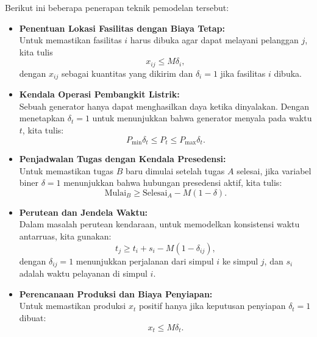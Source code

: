 Berikut ini beberapa penerapan teknik pemodelan tersebut:

\begin{itemize}
  \item \textbf{Penentuan Lokasi Fasilitas dengan Biaya Tetap:}\\
  Untuk memastikan fasilitas \(i\) harus dibuka agar dapat melayani pelanggan \(j\), kita tulis
  \[
  x_{ij} \le M \delta_i,
  \]
  dengan \(x_{ij}\) sebagai kuantitas yang dikirim dan \(\delta_i = 1\) jika fasilitas \(i\) dibuka.


  \item \textbf{Kendala Operasi Pembangkit Listrik:}\\
  Sebuah generator hanya dapat menghasilkan daya ketika dinyalakan. Dengan menetapkan \(\delta_t = 1\) untuk menunjukkan bahwa generator menyala pada waktu \(t\), kita tulis:
  \[
  P_{\min} \delta_t \le P_t \le P_{\max} \delta_t.
  \]

  \item \textbf{Penjadwalan Tugas dengan Kendala Presedensi:}\\
  Untuk memastikan tugas \(B\) baru dimulai setelah tugas \(A\) selesai, jika variabel biner \(\delta = 1\) menunjukkan bahwa hubungan presedensi aktif, kita tulis:
  \[
  \text{Mulai}_B \ge \text{Selesai}_A - M(1 - \delta).
  \]

  \item \textbf{Perutean dan Jendela Waktu:}\\
  Dalam masalah perutean kendaraan, untuk memodelkan konsistensi waktu antarruas, kita gunakan:
  \[
  t_j \ge t_i + s_i - M(1 - \delta_{ij}),
  \]
  dengan \(\delta_{ij} = 1\) menunjukkan perjalanan dari simpul \(i\) ke simpul \(j\), dan \(s_i\) adalah waktu pelayanan di simpul \(i\).

  \item \textbf{Perencanaan Produksi dan Biaya Penyiapan:}\\
  Untuk memastikan produksi \(x_t\) positif hanya jika keputusan penyiapan \(\delta_t = 1\) dibuat:
  \[
  x_t \le M \delta_t.
  \]
\end{itemize}
\newpage
